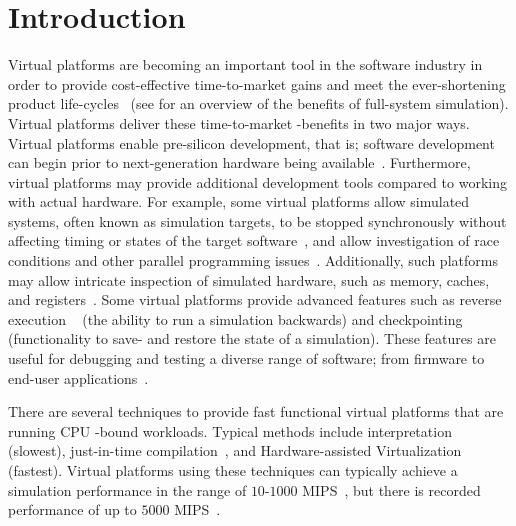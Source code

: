 
\section{Introduction}
\label{cha:introduction}
Virtual platforms are becoming an important tool in the software industry in order to provide cost-effective time-to-market gains and meet the ever-shortening product life-cycles~ (see  for an overview of the benefits of full-system simulation).
Virtual platforms deliver these time-to-market -benefits in two major ways.
Virtual platforms enable pre-silicon development, that is; software development can begin prior to next-generation hardware being available~.
Furthermore, virtual platforms may provide additional development tools compared to working with actual hardware.
For example, some virtual platforms allow simulated systems, often known as simulation targets, to be stopped synchronously without affecting timing or states of the target software~, and allow investigation of race conditions and other parallel programming issues~.
Additionally, such platforms may allow intricate inspection of simulated hardware, such as memory, caches, and registers~.
Some virtual platforms provide advanced features such as reverse execution ~ (the ability to run a simulation backwards) and checkpointing ~ (functionality to save- and restore the state of a simulation).
These features are useful for debugging and testing a diverse range of software; from firmware to end-user applications~.

There are several techniques to provide fast functional virtual platforms that are running CPU -bound workloads.
Typical methods include interpretation ~ (slowest), just-in-time compilation~, and Hardware-assisted Virtualization ~ (fastest).
Virtual platforms using these techniques can typically achieve a simulation performance in the range of $10$-$1000$ MIPS~, but there is recorded performance of up to $5000$ MIPS~.

